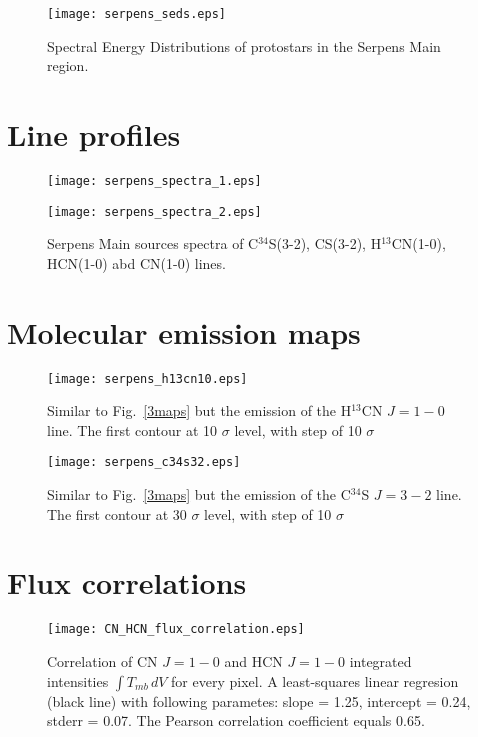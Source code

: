 \documentclass{aa}
\begin{document}
\begin{appendix}
\begin{figure}
   \texttt{[image: serpens\_seds.eps]}
      \caption{Spectral Energy Distributions of protostars in the Serpens Main region.}
         \label{seds}
   \end{figure}


\section{Line profiles}

\begin{figure*}
   \centering
   \texttt{[image: serpens\_spectra\_1.eps]}
         \label{Spectra_1}
   \end{figure*}
\begin{figure*}
   \centering
   \texttt{[image: serpens\_spectra\_2.eps]}
      \caption{Serpens Main sources spectra of C$^{34}$S(3-2), CS(3-2), H$^{13}$CN(1-0), HCN(1-0) abd CN(1-0) lines.}
         \label{Spectra_1}
   \end{figure*}

\section{Molecular emission maps}

\begin{figure}
\texttt{[image: serpens\_h13cn10.eps]}
\caption{Similar to Fig.~\ref{3maps} but the emission of the H$^{13}$CN $J=1-0$ line. The first contour at 10 $\sigma$ level, with step of 10 $\sigma$}
\label{h13cn10}
\end{figure}


\begin{figure}
\texttt{[image: serpens\_c34s32.eps]}
\caption{Similar to Fig.~\ref{3maps} but the emission of the C$^{34}$S $J=3-2$ line. The first contour at 30 $\sigma$ level, with step of 10 $\sigma$}
\label{c34s32}
\end{figure}


\section{Flux correlations}

\begin{figure}
\texttt{[image: CN\_HCN\_flux\_correlation.eps]}
\caption{Correlation of CN $J=1-0$ and HCN $J=1-0$ integrated intensities $\int{T_{mb} \, dV}$ for every pixel. A least-squares linear regresion (black line) with following parametes: slope = 1.25, intercept = 0.24, stderr = 0.07. The Pearson correlation coefficient equals 0.65. }
\label{CN_HCN_corr_all}
\end{figure}


\end{appendix}
\end{document}
